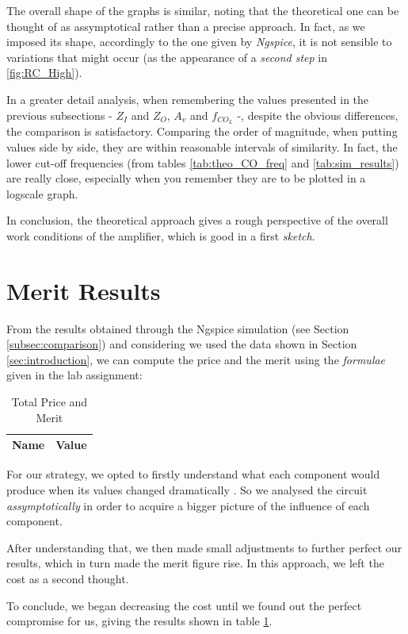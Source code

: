 The overall shape of the graphs is similar, noting that the theoretical one can be thought of as assymptotical rather than a precise approach. In fact, as we imposed its shape, accordingly to the one given by \textit{Ngspice}, it is not sensible to variations that might occur (as the appearance of a \textit{second step} in \ref{fig:RC_High}).

In a greater detail analysis, when remembering the values presented in the previous subsections - $Z_I$ and $Z_O$, $A_v$ and $f_{CO_L}$ -, despite the obvious differences, the comparison is satisfactory. Comparing the order of magnitude, when putting values side by side, they are within reasonable intervals of similarity. In fact, the lower cut-off frequencies (from tables \ref{tab:theo_CO_freq} and \ref{tab:sim_results}) are really close, especially when you remember they are to be plotted in a logscale graph.

In conclusion, the theoretical approach gives a rough perspective of the overall work conditions of the amplifier, which is good in a first \textit{sketch}.

\section{Merit Results}
\label{sec:merit}

From the results obtained through the Ngspice simulation (see Section \ref{subsec:comparison}) and considering we used the data shown in Section \ref{sec:introduction}, we can compute the price and the merit using the \textit{formulae} given in the lab assignment:

\begin{table}[h]
    \centering
    \begin{tabular}{|l|c|}
    \hline
    {\bf Name} & {\bf Value} \\ \hline
    
    \end{tabular}
    \caption{Total Price and Merit}
    \label{tab:price_merit}
\end{table}

For our strategy, we opted to firstly understand what each component would produce when its values changed dramatically . So we analysed the circuit \textit{assymptotically} in order to acquire a bigger picture of the influence of each component.

After understanding that, we then made small adjustments to further perfect our results, which in turn made the merit figure rise. In this approach, we left the cost as a second thought.   

To conclude, we began decreasing the cost until we found out the perfect compromise for us, giving the results shown in table \ref{tab:price_merit}.


